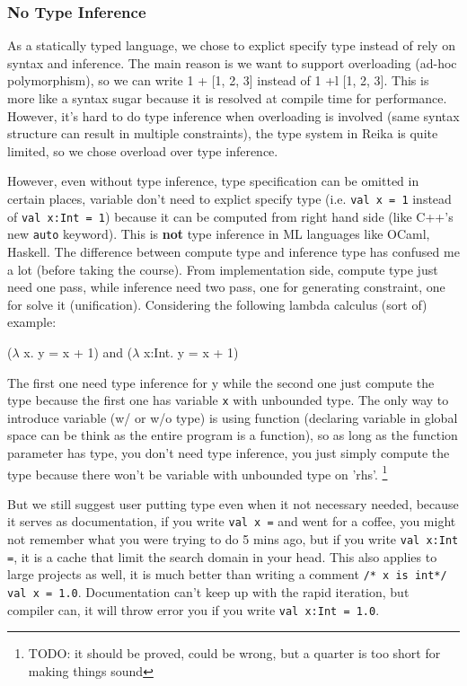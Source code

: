 \documentclass{article}
\begin{document}
\subsubsection{No Type Inference}
\label{subsubsec:no-type-inference}

As a statically typed language, we chose to explict specify type instead of rely on syntax and inference.
The main reason is we want to support overloading (ad-hoc polymorphism), so we can write 1 + [1, 2, 3] instead of 1 +l [1, 2, 3].
This is more like a syntax sugar because it is resolved at compile time for performance.
However, it's hard to do type inference when overloading is involved (same syntax structure can result in multiple constraints),
the type system in Reika is quite limited, so we chose overload over type inference.

However, even without type inference, type specification can be omitted in certain places,
variable don't need to explict specify type (i.e. \verb+val x = 1+ instead of \verb+val x:Int = 1+)
because it can be computed from right hand side (like C++'s new \verb+auto+ keyword).
This is \textbf{not} type inference in ML languages like OCaml, Haskell.
The difference between compute type and inference type has confused me a lot (before taking the course).
From implementation side, compute type just need one pass, while inference need two pass, one for generating constraint, one for solve it (unification).
Considering the following lambda calculus (sort of) example:

\begin{center}
    ($\lambda$ x. y = x + 1) and ($\lambda$ x:Int. y = x + 1)
\end{center}

The first one need type inference for y while the second one just compute the type
because the first one has variable \verb+x+ with unbounded type.
The only way to introduce variable (w/ or w/o type) is using function (declaring variable in global space can be think
as the entire program is a function), so as long as the function parameter has type, you don't need type inference, you just
simply compute the type because there won't be variable with unbounded type on 'rhs'.
\footnote{TODO: it should be proved, could be wrong, but a quarter is too short for making things sound}

But we still suggest user putting type even when it not necessary needed, because it serves as documentation,
if you write \verb+val x =+ and went for a coffee, you might not remember what you were trying to do 5 mins ago,
but if you write \verb+val x:Int =+, it is a cache that limit the search domain in your head.
This also applies to large projects as well, it is much better than writing a comment \verb+/* x is int*/ val x = 1.0+.
Documentation can't keep up with the rapid iteration, but compiler can, it will throw error you if you write \verb+val x:Int = 1.0+.
\end{document}
